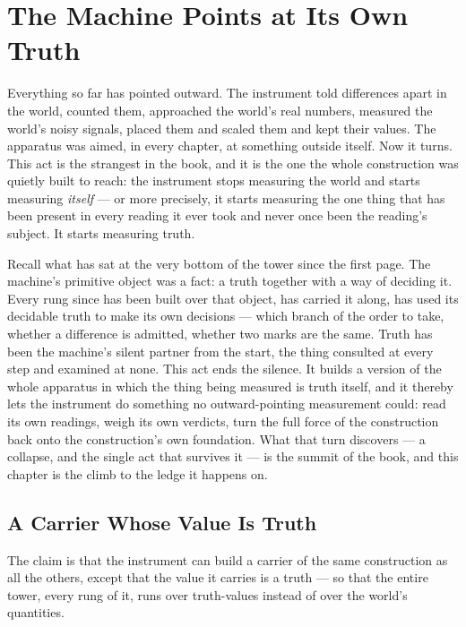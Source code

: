 \chapter{The Machine Points at Its Own Truth}

Everything so far has pointed outward. The instrument told differences apart in the world, counted them, approached
the world's real numbers, measured the world's noisy signals, placed them and scaled them and kept their values.
The apparatus was aimed, in every chapter, at something outside itself. Now it turns. This act is the strangest
in the book, and it is the one the whole construction was quietly built to reach: the instrument stops measuring
the world and starts measuring \emph{itself} --- or more precisely, it starts measuring the one thing that has
been present in every reading it ever took and never once been the reading's subject. It starts measuring truth.

Recall what has sat at the very bottom of the tower since the first page. The machine's primitive object was a
fact: a truth together with a way of deciding it. Every rung since has been built over that object, has carried it
along, has used its decidable truth to make its own decisions --- which branch of the order to take, whether a
difference is admitted, whether two marks are the same. Truth has been the machine's silent partner from the
start, the thing consulted at every step and examined at none. This act ends the silence. It builds a version of
the whole apparatus in which the thing being measured is truth itself, and it thereby lets the instrument do
something no outward-pointing measurement could: read its own readings, weigh its own verdicts, turn the full
force of the construction back onto the construction's own foundation. What that turn discovers --- a collapse,
and the single act that survives it --- is the summit of the book, and this chapter is the climb to the ledge it
happens on.

\section{A Carrier Whose Value Is Truth}

The claim is that the instrument can build a carrier of the same construction as all the others, except that the
value it carries is a truth --- so that the entire tower, every rung of it, runs over truth-values instead of over
the world's quantities.

